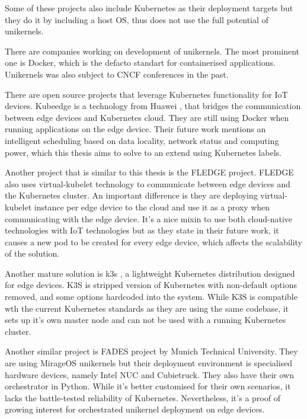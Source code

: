 Some of these projects also include Kubernetes as their deployment targets but they do it by including a host OS, thus does not use the full potential of unikernels.

There are companies working on development of unikernels. The most prominent one is Docker, which is the defacto standart for containerised applications. \cite{francia_2016} Unikernels was also subject to CNCF conferences in the past.


There are open source projects that leverage Kubernetes functionality for IoT devices. Kubeedge \cite{kubeedge} is a technology from Huawei , that bridges the communication between edge devices and Kubernetes cloud. They are still using Docker when running applications on the edge device. Their future work mentions an intelligent scheduling based on data locality, network status and computing power, which this thesis aims to solve to an extend using Kubernetes labels.

Another project that is similar to this thesis is the FLEDGE project\cite{fledge}. FLEDGE also uses virtual-kubelet technology to communicate between edge devices and the Kubernetes cluster. An important difference is they are deploying virtual-kubelet instance per edge device to the cloud and use it as a proxy when communicating with the edge device. It's a nice mixin to use both cloud-native technologies with IoT technologies but as they state in their future work, it causes a new pod to be created for every edge device, which affects the scalability of the solution.

Another mature solution is k3s \cite{k3s}, a lightweight Kubernetes distribution designed for edge devices. K3S is stripped version of Kubernetes with non-default options removed, and some options hardcoded into the system. While K3S is compatible wth the current Kubernetes standards as they are using the same codebase, it sets up it's own master node and can not be used with a running Kubernetes cluster.

Another similar project is FADES \cite{fades} project by Munich Technical University. They are using MirageOS unikernels but their deployment environment is specialised hardware devices, namely Intel NUC and Cubietruck. They also have their own orchestrator in Python. While it's better customised for their own scenarios, it lacks the battle-tested reliability of Kubernetes. Nevertheless, it's a proof of growing interest for orchestrated unikernel deployment on edge devices.